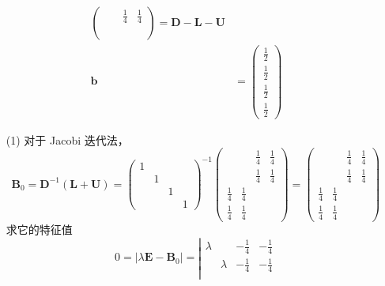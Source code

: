 \documentclass{sjtuarticle}
\begin{document}
\begin{itemize}
\begin{solution}
\begin{align*}
\begin{pmatrix}
                &&\frac14 & \frac14 \\
                \\
                \\
            \end{pmatrix}=\bm{D}-\bm{L}-\bm{U}
            \\ \bm{b}&=\begin{pmatrix}
                \frac12 \\ \frac12 \\ \frac12 \\ \frac12
            \end{pmatrix}
        \end{align*}
        \begin{itemize}
            \item[(1)] 对于 Jacobi 迭代法，
            \begin{equation*}
                \bm{B}_0=\bm{D}^{-1}(\bm{L}+\bm{U})=\begin{pmatrix}
                    1\\
                    &1\\
                    &&1\\
                    &&&1
                \end{pmatrix}^{-1}\begin{pmatrix}
                    && \frac14 & \frac14 \\
                    && \frac14 & \frac14 \\
                    \frac14 & \frac14 \\
                    \frac14 & \frac14 & &
                \end{pmatrix}=\begin{pmatrix}
                    && \frac14 & \frac14 \\
                    && \frac14 & \frac14 \\
                    \frac14 & \frac14 \\
                    \frac14 & \frac14 & &
                \end{pmatrix}
            \end{equation*}
            求它的特征值
            \begin{equation*}
                0=|\lambda \bm{E}-\bm{B}_0|=\left|\begin{matrix}
                    \lambda && -\frac14 & -\frac14 \\
                    & \lambda & -\frac14 & -\frac14 \\

\end{matrix}
\end{equation*}
\end{itemize}
\end{solution}
\end{itemize}
\end{document}
